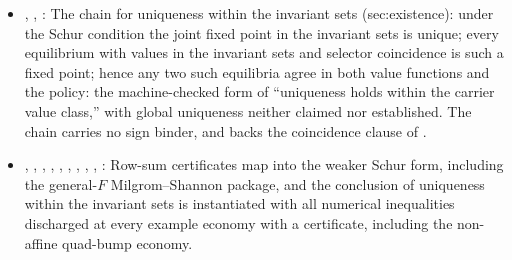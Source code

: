 \begin{itemize}[leftmargin=1.4em,itemsep=1pt]
\item {}, , : The chain for uniqueness within the invariant sets (sec:existence): under the Schur condition the joint fixed point in the invariant sets is unique; every equilibrium with values in the invariant sets and selector coincidence is such a fixed point; hence any two such equilibria agree in both value functions and the policy: the machine-checked form of ``uniqueness holds within the carrier value class,'' with global uniqueness neither claimed nor established. The chain carries no sign binder, and  backs the coincidence clause of .
\item {}, , , , , , , , , : Row-sum certificates map into the weaker Schur form, including the general-\(F\) Milgrom--Shannon package, and the conclusion of uniqueness within the invariant sets is instantiated with all numerical inequalities discharged at every example economy with a certificate, including the non-affine quad-bump economy.
\end{itemize}


